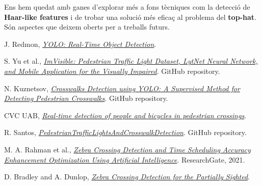 \documentclass[10pt,a4paper,twocolumn,twoside]{article}
\begin{document}
Ens hem quedat amb ganes d’explorar més a fons tècniques com la detecció de \textbf{Haar-like features} i de trobar una solució més eficaç al problema del \textbf{top-hat}. Són aspectes que deixem oberts per a treballs futurs.



\begin{thebibliography}{9}\label{sec:biblio}
	
	J. Redmon, \textit{\href{https://pjreddie.com/darknet/yolo/}{YOLO: Real-Time Object Detection}}.
	
	S. Yu et al., \textit{\href{https://github.com/samuelyu2002/ImVisible}{ImVisible: Pedestrian Traffic Light Dataset, LytNet Neural Network, and Mobile Application for the Visually Impaired}}. GitHub repository.
	
	N. Kuznetsov, \textit{\href{https://github.com/xN1ckuz/Crosswalks-Detection-using-YOLO}{Crosswalks Detection using YOLO: A Supervised Method for Detecting Pedestrian Crosswalks}}. GitHub repository.
	
	CVC UAB, \textit{\href{https://www.cvc.uab.es/portfolio/?page_id=3872}{Real-time detection of people and bicycles in pedestrian crossings}}.
	
	R. Santos, \textit{\href{https://github.com/ronaldosm/PedestrianTrafficLightsAndCrosswalkDetection}{PedestrianTrafficLightsAndCrosswalkDetection}}. GitHub repository.
	
	M. A. Rahman et al., \textit{\href{https://www.researchgate.net/publication/354299232_Zebra_Crossing_Detection_and_Time_Scheduling_Accuracy_Enhancement_Optimization_Using_Artificial_Intelligence}{Zebra Crossing Detection and Time Scheduling Accuracy Enhancement Optimization Using Artificial Intelligence}}. ResearchGate, 2021.
	
	D. Bradley and A. Dunlop, \textit{\href{https://scispace.com/pdf/zebra-crossing-detection-for-the-partially-sighted-22q9n427id.pdf}{Zebra Crossing Detection for the Partially Sighted}}.
	

\end{thebibliography}
\end{document}
